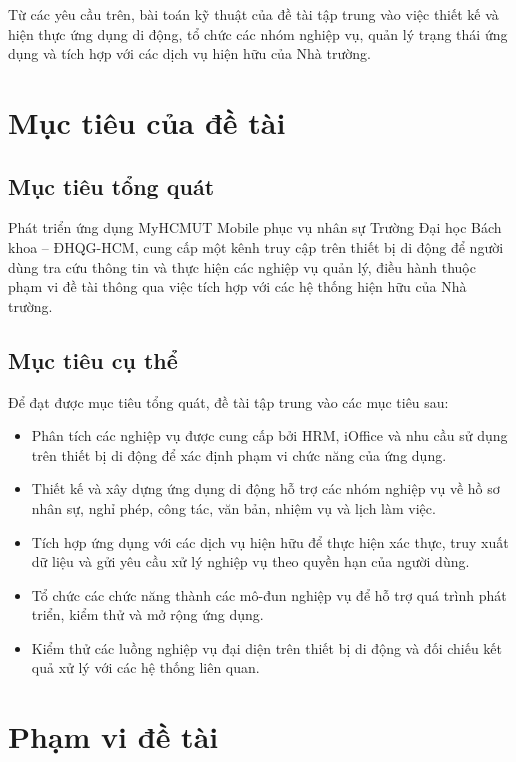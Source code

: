 Từ các yêu cầu trên, bài toán kỹ thuật của đề tài tập trung vào việc thiết kế và hiện thực ứng dụng di động, tổ chức các nhóm nghiệp vụ, quản lý trạng thái ứng dụng và tích hợp với các dịch vụ hiện hữu của Nhà trường.

\section{Mục tiêu của đề tài}
\label{sec:muctieu}

\subsection{Mục tiêu tổng quát}
\label{subsec:muctieu_tongquat}

Phát triển ứng dụng MyHCMUT Mobile phục vụ nhân sự Trường Đại học Bách khoa -- ĐHQG-HCM, cung cấp một kênh truy cập trên thiết bị di động để người dùng tra cứu thông tin và thực hiện các nghiệp vụ quản lý, điều hành thuộc phạm vi đề tài thông qua việc tích hợp với các hệ thống hiện hữu của Nhà trường.

\subsection{Mục tiêu cụ thể}
\label{subsec:muctieu_cuthe}

Để đạt được mục tiêu tổng quát, đề tài tập trung vào các mục tiêu sau:

\begin{itemize}
  \item Phân tích các nghiệp vụ được cung cấp bởi HRM, iOffice và nhu cầu sử dụng trên thiết bị di động để xác định phạm vi chức năng của ứng dụng.
  \item Thiết kế và xây dựng ứng dụng di động hỗ trợ các nhóm nghiệp vụ về hồ sơ nhân sự, nghỉ phép, công tác, văn bản, nhiệm vụ và lịch làm việc.
  \item Tích hợp ứng dụng với các dịch vụ hiện hữu để thực hiện xác thực, truy xuất dữ liệu và gửi yêu cầu xử lý nghiệp vụ theo quyền hạn của người dùng.
  \item Tổ chức các chức năng thành các mô-đun nghiệp vụ để hỗ trợ quá trình phát triển, kiểm thử và mở rộng ứng dụng.
  \item Kiểm thử các luồng nghiệp vụ đại diện trên thiết bị di động và đối chiếu kết quả xử lý với các hệ thống liên quan.
\end{itemize}

\section{Phạm vi đề tài}
\label{sec:doituong_phamvi_ranhgioi}

